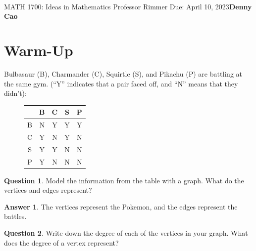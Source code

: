 \documentclass[article, 12pt]{article}
\title{\Large\bf{\psetName}}
\makeatletter
\theoremstyle{definition}
\newcommand{\courseNumber}{MATH 1700}
\newcommand{\courseName}{Ideas in Mathematics}
\newcommand{\professor}{Professor Rimmer}
\newcommand{\dueDate}{Due: April 10, 2023}
\newcommand{\name}{Denny Cao}
\newtheorem{question}{Question}
\newtheorem{answer}{Answer}
\renewcommand{\maketitle}{\bgroup\setlength{\parindent}{0pt}
    \begin{flushleft}
        \textbf{\@title} \\ \vskip0.2cm
        \begingroup
            \fontsize{14pt}{12pt}\selectfont
            \courseNumber: \courseName 
            \vskip0.3cm 
            \professor
        \endgroup \vskip0.3cm
        \dueDate \hfill\rlap{}\bf{\name} \\ \vskip0.1cm
        \hrulefill
    \end{flushleft}\egroup 
}
\makeatother
\begin{document}
    \maketitle
    \thispagestyle{plain}
    \section{Warm-Up}
    Bulbasaur (B), Charmander (C), Squirtle (S), and Pikachu (P) are battling at the same gym. (``Y'' indicates that a pair faced off, and ``N'' means that they didn't):
    \begin{figure}[H]
        \centering
        \begin{tabular}{|c|c|c|c|c|}
            \hline
              & B & C & S & P \\
            \hline
            B & N & Y & Y & Y \\
            C & Y & N & Y & N \\
            S & Y & Y & N & N \\
            P & Y & N & N & N \\
            \hline
        \end{tabular}
    \end{figure}
    \begin{question}
        Model the information from the table with a graph. What do the vertices and edges represent?
    \end{question}
    \begin{answer} The vertices represent the Pokemon, and the edges represent the battles. 
        \begin{figure}[H]
            \centering
        \end{figure}
    \end{answer}
    \begin{question}
        Write down the degree of each of the vertices in your graph. What does the degree of a vertex represent?
    \end{question}
\end{document}
